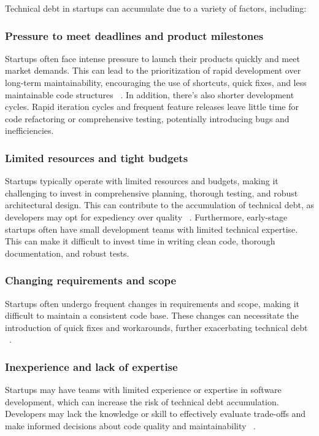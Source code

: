 \documentclass[manuscript]{acmart}
\begin{document}
Technical debt in startups can accumulate due to a variety of factors, including:
\subsubsection{Pressure to meet deadlines and product milestones}
Startups often face intense pressure to launch their products quickly and meet market demands. This can lead to the prioritization of rapid development over long-term maintainability, encouraging the use of shortcuts, quick fixes, and less maintainable code structures ~\cite{Klotins:2018:ETD,Qualityv77:online}. In addition, there's also shorter development cycles. Rapid iteration cycles and frequent feature releases leave little time for code refactoring or comprehensive testing, potentially introducing bugs and inefficiencies.

\subsubsection{Limited resources and tight budgets}
Startups typically operate with limited resources and budgets, making it challenging to invest in comprehensive planning, thorough testing, and robust architectural design. This can contribute to the accumulation of technical debt, as developers may opt for expediency over quality ~\cite{FowlerBottlenecks,Balancin62:online}. Furthermore, early-stage startups often have small development teams with limited technical expertise. This can make it difficult to invest time in writing clean code, thorough documentation, and robust tests.

\subsubsection{Changing requirements and scope}
Startups often undergo frequent changes in requirements and scope, making it difficult to maintain a consistent code base. These changes can necessitate the introduction of quick fixes and workarounds, further exacerbating technical debt ~\cite{DesignSt86:online,Creating18:online}.

\subsubsection{Inexperience and lack of expertise} 
Startups may have teams with limited experience or expertise in software development, which can increase the risk of technical debt accumulation. Developers may lack the knowledge or skill to effectively evaluate trade-offs and make informed decisions about code quality and maintainability ~\cite{Blog21:online}. 
\end{document}
